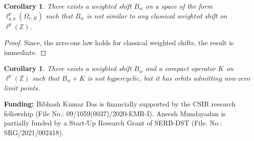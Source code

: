\documentclass[12pt, reqno]{amsart}
\newtheorem{corollary}[theorem]{Corollary}
\theoremstyle{definition}
\theoremstyle{remark}
\numberwithin{equation}{section}
\begin{document}
\begin{corollary}
There exists a weighted shift $B_w$ on a space of the form $\ell^p_{a,b}(\Omega_{r,R})$ such that $B_w$ is not similar to any classical weighted shift on $\ell^p(\mathbb{Z})$.
\end{corollary}

\begin{proof}
    Since, the zero-one law holds for classical weighted shifts, the result is immediate.
\end{proof}

\begin{corollary}
    There exists a weighted shift $B_w$ and a compact operator $K$ on $\ell^p(\mathbb{Z})$ such that $B_w+K$ is not hypercyclic, but it has orbits admitting non-zero limit points. 
\end{corollary}


{\bf Funding:} Bibhash Kumar Das is financially supported by the CSIR research fellowship (File No.: 09/1059(0037)/2020-EMR-I). Aneesh Mundayadan is partially funded by a Start-Up Research Grant of SERB-DST (File. No.: SRG/2021/002418).
\end{document}
